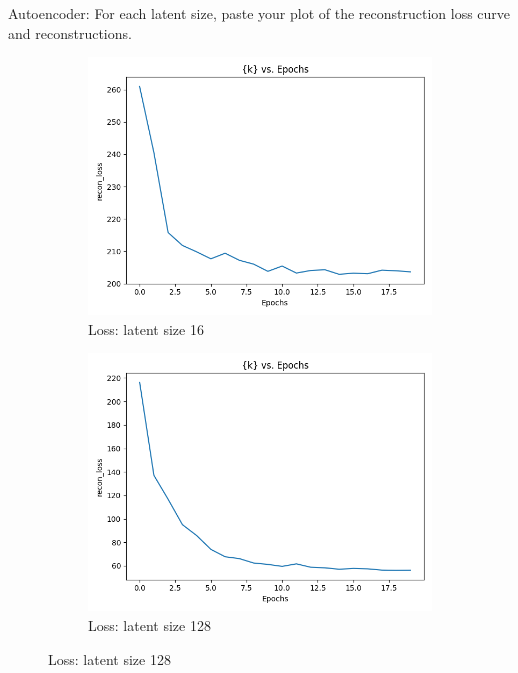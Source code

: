 \documentclass[11pt,addpoints,answers]{exam}
\numberwithin{equation}{section} %
\numberwithin{figure}{section} %
\numberwithin{table}{section} %
\begin{document}
\begin{questions}
\question Autoencoder: For each latent size, paste your plot of the reconstruction loss curve and reconstructions.
\\
\begin{figure}[H]
    \centering
    \begin{subfigure}[b]{0.32\linewidth}
    \includegraphics[width=\linewidth]{2.1_16_loss.png}
    \caption{Loss: latent size 16}
    \end{subfigure}
    \begin{subfigure}[b]{0.32\linewidth}
        \includegraphics[width=\linewidth]{2.1_128_loss.png}
        \caption{Loss: latent size 128}
    \end{subfigure}

\end{figure}
\end{questions}
\end{document}
